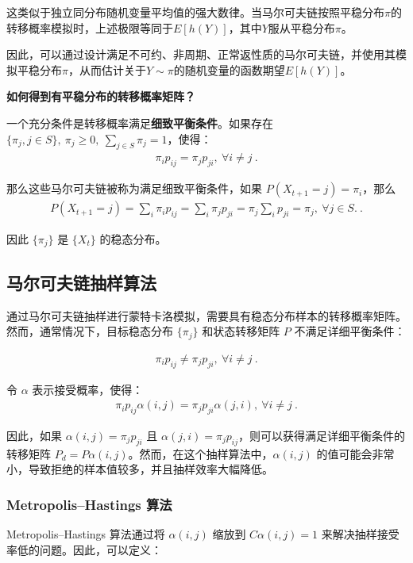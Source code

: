 这类似于独立同分布随机变量平均值的强大数律。当马尔可夫链按照平稳分布$\pi$的转移概率模拟时，上述极限等同于$E[h(Y)]$，其中$Y$服从平稳分布$\pi$。

因此，可以通过设计满足不可约、非周期、正常返性质的马尔可夫链，并使用其模拟平稳分布$\pi$，从而估计关于$Y \sim \pi$的随机变量的函数期望$E[h(Y)]$。

\textbf{如何得到有平稳分布的转移概率矩阵？}

一个充分条件是转移概率满足\textbf{细致平衡条件}。如果存在 $\{ \pi_j, j \in S \}, \ \pi_j\geq 0, \ \sum_{j\in S} \pi_j = 1$，使得：
\begin{align} 
\pi_i p_{ij} = \pi_j p_{ji}, \ \forall i \neq j ~.
\end{align}

那么这些马尔可夫链被称为满足细致平衡条件，如果 $P(X_{t+1} = j) = \pi_i$，那么
\begin{align} 
P(X_{t+1} = j) = \sum_i \pi_i p_{ij} = \sum_i \pi_j p_{ji} = \pi_j \sum_i p_{ji} = \pi_j, \ \forall j \in S. ~.
\end{align}

因此 $\{\pi_j\}$ 是 $\{X_t\}$ 的稳态分布。 

\subsection{马尔可夫链抽样算法}
通过马尔可夫链抽样进行蒙特卡洛模拟，需要具有稳态分布样本的转移概率矩阵。然而，通常情况下，目标稳态分布 $\{\pi_j\}$ 和状态转移矩阵 $P$ 不满足详细平衡条件：


\begin{align} 
\pi_i p_{ij} \neq \pi_j p_{ji}, \ \forall i \neq j ~.
\end{align}

令 $\alpha$ 表示接受概率，使得：
\begin{align} 
\pi_i p_{ij}\alpha(i, j) = \pi_j p_{ji} \alpha(j, i), \ \forall i \neq j  ~.
\end{align}

因此，如果 $\alpha(i, j) = \pi_j p_{ji}$ 且 $\alpha(j, i) = \pi_j p_{ij}$，则可以获得满足详细平衡条件的转移矩阵 $P_d = P \alpha(i,j)$。然而，在这个抽样算法中，$\alpha(i, j)$ 的值可能会非常小，导致拒绝的样本值较多，并且抽样效率大幅降低。

\subsubsection{Metropolis–Hastings 算法}

Metropolis–Hastings 算法通过将 $\alpha(i, j)$ 缩放到 $ C\alpha(i, j) = 1$ 来解决抽样接受率低的问题。因此，可以定义：


